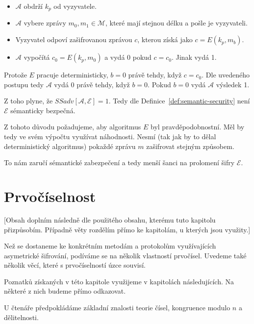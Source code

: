\documentclass[
  program=infoi,
  biblatex,
  figures=false,
  glossaries,
  index
]{kidiplom}
\begin{document}
        \begin{itemize}
            \item
                $\mathcal{A}$ obdrží $k_p$ od vyzyvatele.
            \item 
                $\mathcal{A}$ vybere zprávy $m_0, m_1 \in \mathcal{M}$, které mají stejnou délku a pošle je vyzyvateli.
            \item
                Vyzyvatel odpoví zašifrovanou zprávou $c$, kterou získá jako $c = E(k_p, m_b)$.
            \item
                $\mathcal{A}$ vypočítá $c_0 = E(k_p, m_0)$ a vydá 0 pokud $c = c_0$. Jinak vydá 1.
        \end{itemize}

        Protože $E$ pracuje deterministicky, $b = 0$ právě tehdy, když $c = c_0$.
        Dle uvedeného postupu tedy $\mathcal{A}$ vydá 0 právě tehdy, když $b = 0$.
        Pokud $b = 0$ vydá $\mathcal{A}$ výsledek 1.

        Z toho plyne, že $SSadv[\mathcal{A}, \mathcal{E}] = 1$.
        Tedy dle Definice~\ref{def:semantic-security} není $\mathcal{E}$ sémanticky bezpečná.


    Z tohoto důvodu požadujeme, aby algoritmus $E$ byl pravděpodobnostní.
    Měl by tedy ve svém výpočtu využívat náhodnosti.
    Nesmí (tak jak by to dělal deterministický algoritmus) pokaždé zprávu $m$ zašifrovat stejným způsobem.
    
    To nám zaručí sémantické zabezpečení a tedy menší šanci na prolomení šifry $\mathcal{E}$.


\section{Prvočíselnost}\label{sec:primality}

    [Obsah doplním následně dle použitého obsahu, kterému tuto kapitolu přizpůsobím.
    Případně věty rozdělím přímo ke kapitolám, u kterých jsou využity.]

    \bigskip

    Než se dostaneme ke konkrétním metodám a protokolům využívajících asymetrické šifrování, podíváme se na několik vlastností prvočísel.
    Uvedeme také několik věcí, které s prvočíselností úzce souvisí.

    Poznatků získaných v této kapitole využijeme v kapitolách následujících.
    Na některé z nich budeme přímo odkazovat.

    U čtenáře předpokládáme základní znalosti teorie čísel, kongruence modulo $n$ a dělitelnosti.
\end{document}
